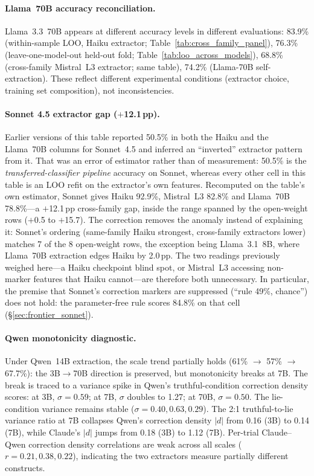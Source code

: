 \paragraph{Llama~70B accuracy reconciliation.} Llama~3.3~70B appears at different accuracy levels in different evaluations: 83.9\% (within-sample LOO, Haiku extractor; Table~\ref{tab:cross_family_panel}), 76.3\% (leave-one-model-out held-out fold; Table~\ref{tab:loo_across_models}), 68.8\% (cross-family Mistral~L3 extractor; same table), 74.2\% (Llama-70B self-extraction). These reflect different experimental conditions (extractor choice, training set composition), not inconsistencies.

\paragraph{Sonnet 4.5 extractor gap ($+$12.1\,pp).} Earlier versions of this table reported 50.5\% in both the Haiku and the Llama~70B columns for Sonnet~4.5 and inferred an ``inverted'' extractor pattern from it. That was an error of estimator rather than of measurement: 50.5\% is the \emph{transferred-classifier pipeline} accuracy on Sonnet, whereas every other cell in this table is an LOO refit on the extractor's own features. Recomputed on the table's own estimator, Sonnet gives Haiku 92.9\%, Mistral~L3 82.8\% and Llama~70B 78.8\%---a $+$12.1\,pp cross-family gap, inside the range spanned by the open-weight rows ($+$0.5 to $+$15.7). The correction removes the anomaly instead of explaining it: Sonnet's ordering (same-family Haiku strongest, cross-family extractors lower) matches 7 of the 8 open-weight rows, the exception being Llama~3.1~8B, where Llama~70B extraction edges Haiku by 2.0\,pp. The two readings previously weighed here---a Haiku checkpoint blind spot, or Mistral~L3 accessing non-marker features that Haiku cannot---are therefore both unnecessary. In particular, the premise that Sonnet's correction markers are suppressed (``rule 49\%, chance'') does not hold: the parameter-free rule scores 84.8\% on that cell (\S\ref{sec:frontier_sonnet}).

\paragraph{Qwen monotonicity diagnostic.} Under Qwen~14B extraction, the scale trend partially holds (61\% $\to$ 57\% $\to$ 67.7\%): the 3B$\to$70B direction is preserved, but monotonicity breaks at 7B. The break is traced to a variance spike in Qwen's truthful-condition correction density scores: at 3B, $\sigma=0.59$; at 7B, $\sigma$ doubles to 1.27; at 70B, $\sigma=0.50$. The lie-condition variance remains stable ($\sigma = 0.40, 0.63, 0.29$). The 2:1 truthful-to-lie variance ratio at 7B collapses Qwen's correction density $|d|$ from 0.16 (3B) to 0.14 (7B), while Claude's $|d|$ jumps from 0.18 (3B) to 1.12 (7B). Per-trial Claude--Qwen correction density correlations are weak across all scales ($r = 0.21, 0.38, 0.22$), indicating the two extractors measure partially different constructs.

